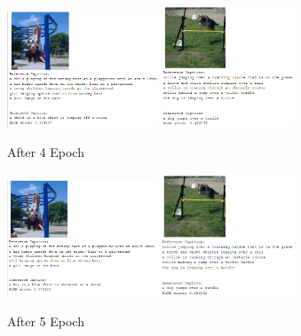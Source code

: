 \documentclass{article}
\begin{document}
    \begin{figure}[H]
        \centering
        \includegraphics[width=0.4\textwidth]{rnn_girl_epoch_4.PNG}
        \includegraphics[width=0.35\textwidth]{rnn_dog_epoch_4.PNG}
        \caption{After 4 Epoch}
    \end{figure}

    \begin{figure}[H]
        \centering
        \includegraphics[width=0.4\textwidth]{rnn_girl_epoch_5.PNG}
        \includegraphics[width=0.35\textwidth]{rnn_dog_epoch_5.PNG}
        \caption{After 5 Epoch}
    \end{figure}
\end{document}
